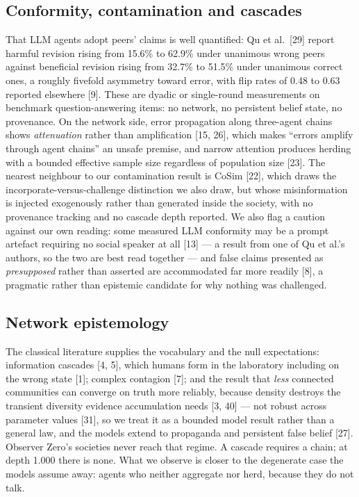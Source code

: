 \documentclass[pdflatex,sn-basic]{sn-jnl}
\begin{document}
\hypertarget{conformity-contamination-and-cascades}{%
\subsection{Conformity, contamination and cascades}\label{conformity-contamination-and-cascades}}

That LLM agents adopt peers' claims is well
quantified: Qu et al.~{[}29{]} report harmful revision rising from 15.6\% to 62.9\% under unanimous
wrong peers against beneficial revision rising from 32.7\% to 51.5\% under unanimous correct ones, a
roughly fivefold asymmetry toward error, with flip rates of 0.48 to 0.63 reported elsewhere {[}9{]}.
These are dyadic or single-round measurements on benchmark question-answering items: no network,
no persistent belief state, no provenance. On the network side, error propagation along
three-agent chains shows \emph{attenuation} rather than amplification {[}15, 26{]}, which makes ``errors
amplify through agent chains'' an unsafe premise, and narrow attention produces herding with a
bounded effective sample size regardless of population size {[}23{]}. The nearest neighbour to our
contamination result is CoSim {[}22{]}, which draws the incorporate-versus-challenge distinction we
also draw, but whose misinformation is injected exogenously rather than generated inside the
society, with no provenance tracking and no cascade depth reported. We also flag a caution against
our own reading: some measured LLM conformity may be a prompt artefact requiring no social speaker
at all {[}13{]} --- a result from one of Qu et al.'s authors, so the two are best read together --- and false
claims presented as \emph{presupposed} rather than asserted are accommodated far more readily {[}8{]}, a
pragmatic rather than epistemic candidate for why nothing was challenged.

\hypertarget{network-epistemology}{%
\subsection{Network epistemology}\label{network-epistemology}}

The classical literature supplies the vocabulary and the null
expectations: information cascades {[}4, 5{]}, which humans form in the laboratory including on the
wrong state {[}1{]}; complex contagion {[}7{]}; and the result that \emph{less} connected communities can
converge on truth more reliably, because density destroys the transient diversity evidence
accumulation needs {[}3, 40{]} --- not robust across parameter values {[}31{]}, so we treat it as a bounded
model result rather than a general law, and the models extend to propaganda and persistent false
belief {[}27{]}. Observer Zero's societies never reach that regime. A cascade requires a chain; at
depth 1.000 there is none. What we observe is closer to the degenerate case the models assume
away: agents who neither aggregate nor herd, because they do not talk.
\end{document}
